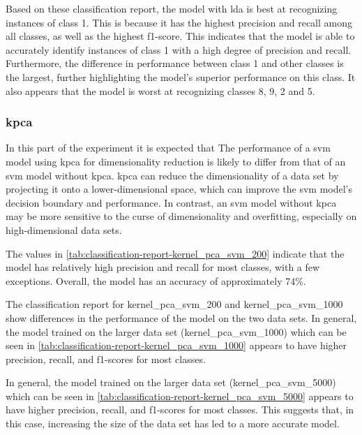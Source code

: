 Based on these classification report, the model with \gls{lda} is best at recognizing instances of class 1. This is because it has the highest precision and recall among all classes, as well as the highest f1-score. This indicates that the model is able to accurately identify instances of class 1 with a high degree of precision and recall. Furthermore, the difference in performance between class 1 and other classes is the largest, further highlighting the model's superior performance on this class. It also appears that the model is worst at recognizing classes 8, 9, 2 and 5.

\subsubsection{\gls{kpca}}\label{subsubsec:experiment_4_kernel_pca}
In this part of the experiment it is expected that The performance of a \gls{svm} model using  \gls{kpca} for dimensionality reduction is likely to differ from that of an \gls{svm} model without \gls{kpca}. \gls{kpca} can reduce the dimensionality of a data set by projecting it onto a lower-dimensional space, which can improve the \gls{svm} model's decision boundary and performance. In contrast, an \gls{svm} model without \gls{kpca} may be more sensitive to the curse of dimensionality and overfitting, especially on high-dimensional data sets. 




The values in \ref{tab:classification-report-kernel_pca_svm_200} indicate that the model has relatively high precision and recall for most classes, with a few exceptions. Overall, the model has an accuracy of approximately 74\%.



The classification report for kernel\_pca\_svm\_200 and kernel\_pca\_svm\_1000 show differences in the performance of the model on the two data sets. In general, the model trained on the larger data set (kernel\_pca\_svm\_1000) which can be seen in \ref{tab:classification-report-kernel_pca_svm_1000} appears to have higher precision, recall, and f1-scores for most classes. 



In general, the model trained on the larger data set (kernel\_pca\_svm\_5000) which can be seen in \ref{tab:classification-report-kernel_pca_svm_5000} appears to have higher precision, recall, and f1-scores for most classes. This suggests that, in this case, increasing the size of the data set has led to a more accurate model.


